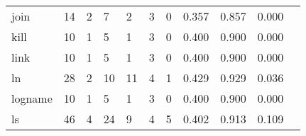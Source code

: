 \begin{longtable}{lp{1.2cm}p{1.2cm}p{1.2cm}p{1.2cm}p{1.2cm}p{1.2cm}p{1.2cm}p{1.2cm}p{1.2cm}p{1.2cm}}
join      &                                    14 &                                                  2 &                                                  7 &                                                  2 &                                                  3 &                                                  0 &                                         0.357 &                                              0.857 &                                              0.000 \\
kill      &                                    10 &                                                  1 &                                                  5 &                                                  1 &                                                  3 &                                                  0 &                                         0.400 &                                              0.900 &                                              0.000 \\
link      &                                    10 &                                                  1 &                                                  5 &                                                  1 &                                                  3 &                                                  0 &                                         0.400 &                                              0.900 &                                              0.000 \\
ln        &                                    28 &                                                  2 &                                                 10 &                                                 11 &                                                  4 &                                                  1 &                                         0.429 &                                              0.929 &                                              0.036 \\
logname   &                                    10 &                                                  1 &                                                  5 &                                                  1 &                                                  3 &                                                  0 &                                         0.400 &                                              0.900 &                                              0.000 \\
ls        &                                    46 &                                                  4 &                                                 24 &                                                  9 &                                                  4 &                                                  5 &                                         0.402 &                                              0.913 &                                              0.109 \\

\end{longtable}
